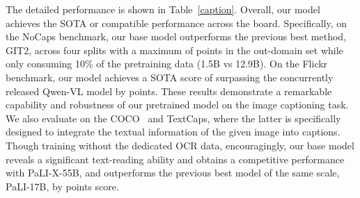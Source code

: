 The detailed performance is shown in Table~\ref{caption}.  Overall, our model achieves the SOTA or compatible performance across the board. Specifically, on the NoCaps benchmark, our base model outperforms the previous best method, GIT2, across four splits with a maximum of  points in the out-domain set while only consuming 10\% of the pretraining data (1.5B vs 12.9B). On the Flickr benchmark, our model achieves a SOTA score of  surpassing the concurrently released Qwen-VL model by  points. These results demonstrate a remarkable capability and robustness of our pretrained model on the image captioning task.
We also evaluate on the COCO~\citep{lin2014microsoft} and TextCaps, where the latter is specifically designed to integrate the textual information of the given image into captions.
Though training without the dedicated OCR data, encouragingly, our base model reveals a significant text-reading ability and obtains a competitive performance with PaLI-X-55B, and outperforms the previous best model of the same scale, PaLI-17B, by  points score.

